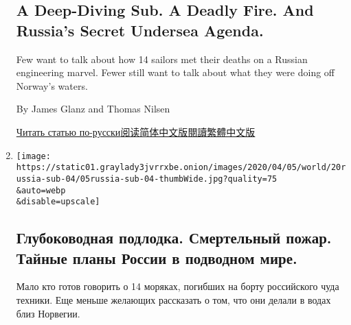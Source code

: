 \begin{enumerate}
  \hypertarget{a-deep-diving-sub-a-deadly-fire-and-russias-secret-undersea-agenda}{%
  \subsection{A Deep-Diving Sub. A Deadly Fire. And Russia's Secret
  Undersea
  Agenda.}\label{a-deep-diving-sub-a-deadly-fire-and-russias-secret-undersea-agenda}}

  Few want to talk about how 14 sailors met their deaths on a Russian
  engineering marvel. Fewer still want to talk about what they were
  doing off Norway's waters.

  By James Glanz and Thomas Nilsen

  \href{https://www.nytimes3xbfgragh.onion/ru/2020/04/20/world/europe/russia-submarine-losharik-norway.html}{Читать
  статью
  по-русски}\href{https://cn.nytimes3xbfgragh.onion/world/20200421/russian-submarine-fire-losharik/}{阅读简体中文版}\href{https://cn.nytimes3xbfgragh.onion/world/20200421/russian-submarine-fire-losharik/zh-hant/}{閱讀繁體中文版}
\item
  \href{/ru/2020/04/20/world/europe/russia-submarine-losharik-norway.html}{}

  \texttt{[image: https://static01.graylady3jvrrxbe.onion/images/2020/04/05/world/20russia-sub-04/05russia-sub-04-thumbWide.jpg?quality=75\\\&auto=webp\\\&disable=upscale]}

  \hypertarget{ux433ux43bux443ux431ux43eux43aux43eux432ux43eux434ux43dux430ux44f-ux43fux43eux434ux43bux43eux434ux43aux430-ux441ux43cux435ux440ux442ux435ux43bux44cux43dux44bux439-ux43fux43eux436ux430ux440-ux442ux430ux439ux43dux44bux435-ux43fux43bux430ux43dux44b-ux440ux43eux441ux441ux438ux438-ux432-ux43fux43eux434ux432ux43eux434ux43dux43eux43c-ux43cux438ux440ux435}{%
  \subsection{Глубоководная подлодка. Смертельный пожар. Тайные планы
  России в подводном
  мире.}\label{ux433ux43bux443ux431ux43eux43aux43eux432ux43eux434ux43dux430ux44f-ux43fux43eux434ux43bux43eux434ux43aux430-ux441ux43cux435ux440ux442ux435ux43bux44cux43dux44bux439-ux43fux43eux436ux430ux440-ux442ux430ux439ux43dux44bux435-ux43fux43bux430ux43dux44b-ux440ux43eux441ux441ux438ux438-ux432-ux43fux43eux434ux432ux43eux434ux43dux43eux43c-ux43cux438ux440ux435}}

  Мало кто готов говорить о 14 моряках, погибших на борту российского
  чуда техники. Еще меньше желающих рассказать о том, что они делали в
  водах близ Норвегии.


\end{enumerate}
